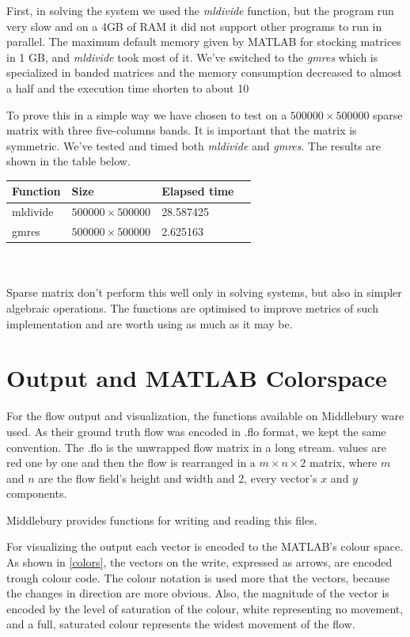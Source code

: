 \documentclass[12pt,a4paper,twoside]{report}
\begin{document}
{First, in solving the system we used the \textit{mldivide} function, but the program run very slow and on a 4GB of RAM it did not support other programs to run in parallel. The maximum default memory given by MATLAB for stocking matrices in 1 GB, and \textit{mldivide} took most of it.
We've switched to the \textit{gmres} which is specialized in banded matrices and the memory consumption decreased to almost a half and the execution time shorten to about 10%

To prove this in a simple way we have chosen to test on a  $500000 \times 500000$ sparse matrix with three five-columns bands. It is important that the matrix is symmetric. We've tested and timed both \textit{mldivide} and \textit{gmres}. The results are shown in the table below.
\\

\begin{tabular}{ l l  l l }
	\hline
	Function  &           Size  &                Elapsed time   \\
	\hline
mldivide    &    $500000\times 500000$      &      28.587425   \\
gmres  &    $500000\times 500000$       &         2.625163   
	
\end{tabular}
\\
\\

Sparse matrix don't perform this well only in solving systems, but also in simpler algebraic operations. The functions are optimised to improve metrics of such implementation and are worth using as much as it may be.

\section{Output and MATLAB Colorspace}


For the flow output and visualization, the functions available on Middlebury ware used.
As their ground truth flow was encoded in .flo format, we kept the same convention. The .flo is the unwrapped flow matrix in a long stream. values are red one by one and then the flow is rearranged in a $m\times n \times 2$ matrix, where $m$ and $n$ are the flow field's height and width and 2, every vector's $x$ and $y$ components.

Middlebury\cite{middleburry} provides functions for writing and reading this files. 

For visualizing the output each vector is encoded to the MATLAB's colour space. As shown in \ref{colors}, the vectors on the write, expressed as arrows, are encoded trough colour code. The colour notation is  used more that the vectors, because the changes in direction are more obvious. Also, the magnitude of the vector is encoded by the level of saturation of the colour, white representing no movement, and a full, saturated colour represents the widest movement of the flow.

}
\end{document}
